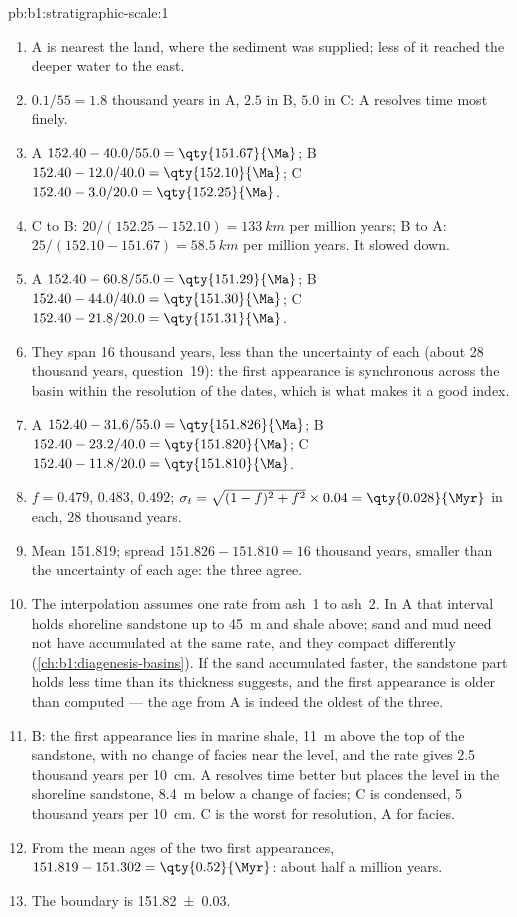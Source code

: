 \begin{solution}{pb:b1:stratigraphic-scale:1}
\begin{enumerate}
        $48.0/1.20 = \qty{40.0}{}$; C $24.0/1.20 = \qty{20.0}{}$.
  \item A is nearest the land, where the sediment was supplied; less of it
        reached the deeper water to the east.
  \item $0.1/55 = \num{1.8}$ thousand years in A, $\num{2.5}$ in B, $\num{5.0}$
        in C: A resolves time most finely.
  \item A $152.40 - 40.0/55.0 = \qty{151.67}{\Ma}$; B $152.40 - 12.0/40.0 =
        \qty{152.10}{\Ma}$; C $152.40 - 3.0/20.0 = \qty{152.25}{\Ma}$.
  \item C to B: $20/(152.25 - 152.10) = \qty{133}{km}$ per million years; B to A:
        $25/(152.10 - 151.67) = \qty{58.5}{km}$ per million years. It slowed
        down.
  \item A $152.40 - 60.8/55.0 = \qty{151.29}{\Ma}$; B $152.40 - 44.0/40.0 =
        \qty{151.30}{\Ma}$; C $152.40 - 21.8/20.0 = \qty{151.31}{\Ma}$.
  \item They span \num{16} thousand years, less than the uncertainty of each
        (about \num{28} thousand years, question~19): the first appearance is
        synchronous across the basin within the resolution of the dates, which
        is what makes it a good index.
  \item A $152.40 - 31.6/55.0 = \qty{151.826}{\Ma}$; B $152.40 - 23.2/40.0 =
        \qty{151.820}{\Ma}$; C $152.40 - 11.8/20.0 = \qty{151.810}{\Ma}$.
  \item $f = 0.479$, $0.483$, $0.492$; $\sigma_t = \sqrt{(1 - f)^2 + f^2} \times
        0.04 = \qty{0.028}{\Myr}$ in each, \num{28} thousand years.
  \item Mean \qty{151.819}{\Ma}; spread $151.826 - 151.810 = \num{16}$ thousand
        years, smaller than the uncertainty of each age: the three agree.
  \item The interpolation assumes one rate from ash~1 to ash~2. In A that
        interval holds shoreline sandstone up to \qty{45}{m} and shale above;
        sand and mud need not have accumulated at the same rate, and they
        compact differently (\cref{ch:b1:diagenesis-basins}). If the sand
        accumulated faster, the sandstone part holds less time than its
        thickness suggests, and the first appearance is older than computed
        --- the age from A is indeed the oldest of the three.
  \item B: the first appearance lies in marine shale, \qty{11}{m} above the
        top of the sandstone, with no change of facies near the level, and the
        rate gives \num{2.5} thousand years per \qty{10}{cm}. A resolves time
        better but places the level in the shoreline sandstone, \qty{8.4}{m}
        below a change of facies; C is condensed, \num{5} thousand years per
        \qty{10}{cm}. C is the worst for resolution, A for facies.
  \item From the mean ages of the two first appearances, $151.819 - 151.302 =
        \qty{0.52}{\Myr}$: about half a million years.
  \item The boundary is \qty[uncertainty-mode=separate]{151.82(3)}{\Ma}.
\end{enumerate}
\end{solution}
